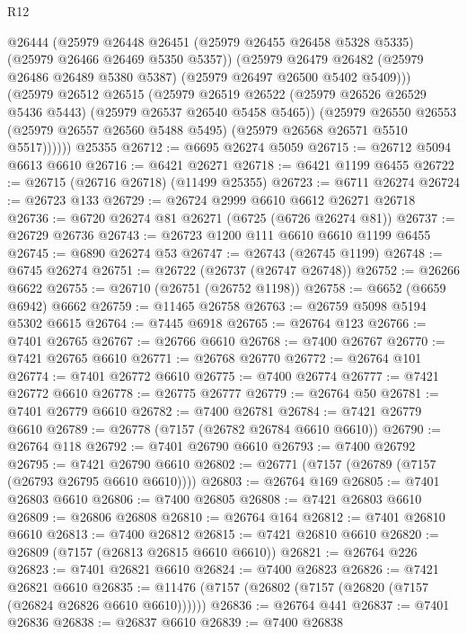\begin{lexlean}{R12}
\begin{coremodule}
{{{{{{{{{{{{{{{{{{{{{{{{{{{{{{{{{{{{{{{{{{{{{{{{{{{{{{{{{{{{{{{{{{{{{{{{{{{{{{{{{{            @26444
            (@25979
              @26448
              @26451
              (@25979 @26455 @26458 @5328 @5335)
              (@25979 @26466 @26469 @5350 @5357))
            (@25979
              @26479
              @26482
              (@25979 @26486 @26489 @5380 @5387)
              (@25979 @26497 @26500 @5402 @5409)))
          (@25979
            @26512
            @26515
            (@25979
              @26519
              @26522
              (@25979 @26526 @26529 @5436 @5443)
              (@25979 @26537 @26540 @5458 @5465))
            (@25979
              @26550
              @26553
              (@25979 @26557 @26560 @5488 @5495)
              (@25979 @26568 @26571 @5510 @5517))))))
    @25355
@26712 := @6695 @26274 @5059
@26715 := @26712 @5094 @6613 @6610
@26716 := @6421 @26271
@26718 := @6421 @1199 @6455
@26722 := @26715 (@26716 @26718) (@11499 @25355)
@26723 := @6711 @26274
@26724 := @26723 @133
@26729 := @26724 @2999 @6610 @6612 @26271 @26718
@26736 := @6720 @26274 @81 @26271 (@6725 (@6726 @26274 @81))
@26737 := @26729 @26736
@26743 := @26723 @1200 @111 @6610 @6610 @1199 @6455
@26745 := @6890 @26274 @53
@26747 := @26743 (@26745 @1199)
@26748 := @6745 @26274
@26751 := @26722 (@26737 (@26747 @26748))
@26752 := @26266 @6622
@26755 := @26710 (@26751 (@26752 @1198))
@26758 := @6652 (@6659 @6942) @6662
@26759 := @11465 @26758
@26763 := @26759 @5098 @5194 @5302 @6615
@26764 := @7445 @6918
@26765 := @26764 @123
@26766 := @7401 @26765
@26767 := @26766 @6610
@26768 := @7400 @26767
@26770 := @7421 @26765 @6610
@26771 := @26768 @26770
@26772 := @26764 @101
@26774 := @7401 @26772 @6610
@26775 := @7400 @26774
@26777 := @7421 @26772 @6610
@26778 := @26775 @26777
@26779 := @26764 @50
@26781 := @7401 @26779 @6610
@26782 := @7400 @26781
@26784 := @7421 @26779 @6610
@26789 := @26778 (@7157 (@26782 @26784 @6610 @6610))
@26790 := @26764 @118
@26792 := @7401 @26790 @6610
@26793 := @7400 @26792
@26795 := @7421 @26790 @6610
@26802 := @26771 (@7157 (@26789 (@7157 (@26793 @26795 @6610 @6610))))
@26803 := @26764 @169
@26805 := @7401 @26803 @6610
@26806 := @7400 @26805
@26808 := @7421 @26803 @6610
@26809 := @26806 @26808
@26810 := @26764 @164
@26812 := @7401 @26810 @6610
@26813 := @7400 @26812
@26815 := @7421 @26810 @6610
@26820 := @26809 (@7157 (@26813 @26815 @6610 @6610))
@26821 := @26764 @226
@26823 := @7401 @26821 @6610
@26824 := @7400 @26823
@26826 := @7421 @26821 @6610
@26835 := @11476 (@7157 (@26802 (@7157 (@26820 (@7157 (@26824 @26826 @6610 @6610))))))
@26836 := @26764 @441
@26837 := @7401 @26836
@26838 := @26837 @6610
@26839 := @7400 @26838
}}}}}}}}}}}}}}}}}}}}}}}}}}}}}}}}}}}}}}}}}}}}}}}}}}}}}}}}}}}}}}}}}}}}}}}}}}}}}}}}}}
\end{coremodule}
\end{lexlean}
